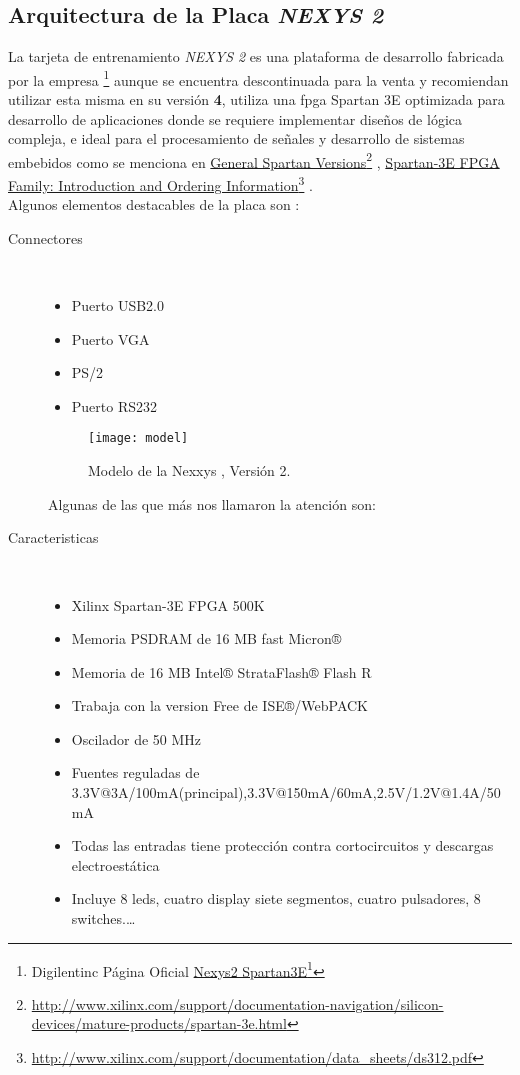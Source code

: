 \documentclass[a4paper]{article}
\newcommand\fnurl[2]{%
\href{#2}{#1}\footnote{\url{#2}}%
}
\begin{document}
\subsection{Arquitectura de la Placa \emph{NEXYS 2}}
La tarjeta de entrenamiento \emph{NEXYS 2} es una plataforma de desarrollo fabricada por la empresa \footnote{Digilentinc Página Oficial \fnurl{Nexys2 Spartan3E}{http://store.digilentinc.com/nexys-2-spartan-3e-fpga-trainer-board-retired-see-nexys-4-ddr/}} aunque se encuentra descontinuada para la venta y recomiendan utilizar esta misma en su versión \textbf{4}, utiliza una fpga Spartan 3E optimizada para desarrollo de aplicaciones donde se requiere implementar diseños de lógica compleja, e ideal para el procesamiento de señales y desarrollo de sistemas embebidos como se menciona en \fnurl{General Spartan Versions}{http://www.xilinx.com/support/documentation-navigation/silicon-devices/mature-products/spartan-3e.html}, \fnurl{Spartan-3E FPGA Family: Introduction and Ordering Information}{http://www.xilinx.com/support/documentation/data_sheets/ds312.pdf}.
\\Algunos elementos destacables de la placa son :
\begin{description}
  \item[Connectores] \hfill \\
  	\begin{itemize}
		\item Puerto USB2.0
	    \item Puerto VGA
		\item PS/2
	    \item Puerto RS232
    \end{itemize}
\begin{figure}[H]
 \centering
   \texttt{[image: model]}
 \caption{Modelo de la Nexxys , Versión 2.}
    \label{fig:modelo}
\end{figure}
Algunas de las que más nos llamaron la atención son:\\
  \item[Caracteristicas] \hfill \\
    	\begin{itemize}
			\item Xilinx Spartan-3E FPGA 500K
			\item Memoria PSDRAM de 16 MB fast Micron® 
			\item Memoria de 16 MB Intel® StrataFlash® Flash R 
      		\item Trabaja con la version Free de ISE®/WebPACK 
            \item Oscilador de 50 MHz
			\item Fuentes reguladas de 3.3V@3A/100mA(principal),3.3V@150mA/60mA,2.5V/1.2V@1.4A/50mA
            \item Todas las entradas tiene protección contra cortocircuitos y descargas electroestática
  			\item Incluye  8 leds, cuatro display siete segmentos, cuatro pulsadores, 8 switches.\ldots
      \end{itemize}
\end{description}
\end{document}
